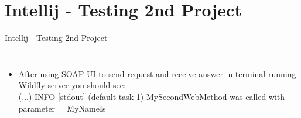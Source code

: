 \documentclass[aspectratio=1610,english]{beamer} %
\begin{document}
	\section{Intellij - Testing 2nd Project}
	\begin{frame}{Intellij - Testing 2nd Project}
		\begin{columns}
				\begin{minipage}{\textwidth}
				\end{minipage}
				
				\begin{itemize}
					\tiny
					\color{black}
					\item After using SOAP UI to send request and receive answer in terminal running Wildfly server you should see: \\
					\color{gray}
					\fontsize{3}{4} \selectfont	
					(...) INFO  [stdout] (default task-1) MySecondWebMethod was called with parameter = MyNameIs 
				\end{itemize}
		\end{columns}
	\end{frame}
\end{document}
